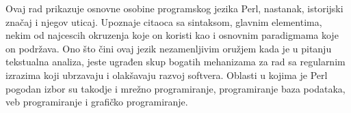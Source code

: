\documentclass[a4paper]{article}
\begin{document}
Ovaj rad prikazuje osnovne osobine programskog jezika Perl, nastanak, istorijski značaj i njegov uticaj. Upoznaje citaoca sa sintaksom, glavnim elementima, nekim od najcescih okruzenja koje on koristi kao i osnovnim paradigmama koje on podržava. Ono što čini ovaj jezik nezamenljivim oružjem kada je u pitanju tekstualna analiza, jeste ugrađen skup bogatih mehanizama za rad sa regularnim izrazima koji ubrzavaju i olakšavaju razvoj softvera. Oblasti u kojima je Perl pogodan izbor su takodje i mrežno programiranje, programiranje baza podataka, veb programiranje i grafičko programiranje. 


\appendix
 

\end{document}
